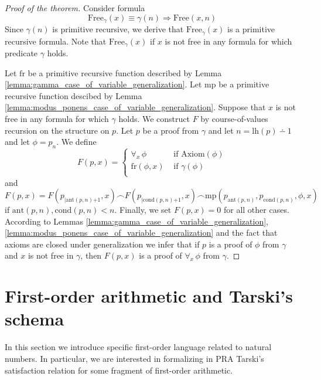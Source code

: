 \documentclass[10pt]{amsart}
\newcommand{\mra}{\boldsymbol{\Rightarrow}}
\newcommand{\meq}{\boldsymbol{=}}
\newcommand{\mplus}{\boldsymbol{+}}
\begin{document}
\begin{proof}[Proof of the theorem]
  Consider formula
  $$\mathrm{Free}_{\gamma}(x) \equiv \gamma(n) \mra \mathrm{Free}(x,n)$$
  Since $\gamma(n)$ is primitive recursive, we derive that $\mathrm{Free}_{\gamma}(x)$ is a primitive recursive formula. Note that $\mathrm{Free}_{\gamma}(x)$ if $x$ is not free in any formula for which predicate $\gamma$ holds.

  Let $\mathrm{fr}$ be a primitive recursive function described by Lemma \ref{lemma:gamma_case_of_variable_generalization}. Let $\mathrm{mp}$ be a primitive recursive function descibed by Lemma \ref{lemma:modus_ponens_case_of_variable_generalization}.
  Suppose that $x$ is not free in any formula for which $\gamma$ holds. We construct $F$ by course-of-values recursion on the structure on $p$. Let $p$ be a proof from $\gamma$ and let $n = \mathrm{lh}(p) \dotminus 1$ and let $\phi = p_n$. We define 
  $$F(p,x) \meq \begin{cases}
    \forall_x\,\phi &\mbox{ if }\mathrm{Axiom}(\phi)\\
    \mathrm{fr}(\phi,x)&\mbox{ if }\gamma(\phi)\\
  \end{cases}$$
  and
  $$F(p,x) \meq F(p_{\mid \mathrm{ant}(p,n) \mplus 1},x) \frown F(p_{\mid \mathrm{cond}(p,n) \mplus 1},x)\frown \mathrm{mp}(p_{\mathrm{ant}(p,n)},p_{\mathrm{cond}(p,n)},\phi,x)$$
  if $\mathrm{ant}(p,n),\mathrm{cond}(p,n) < n$. Finally, we set $F(p,x) \meq 0$ for all other cases. According to Lemmas \ref{lemma:gamma_case_of_variable_generalization}, \ref{lemma:modus_ponens_case_of_variable_generalization} and the fact that axioms are closed under generalization we infer that if $p$ is a proof of $\phi$ from $\gamma$ and $x$ is not free in $\gamma$, then $F(p,x)$ is a proof of $\forall_x\,\phi$ from $\gamma$.
 \end{proof}

\section{First-order arithmetic and Tarski's schema}
\noindent
In this section we introduce specific first-order language related to natural numbers. In particular, we are interested in formalizing in $\mathrm{PRA}$ Tarski's satisfaction relation for some fragment of first-order arithmetic.
\end{document}
